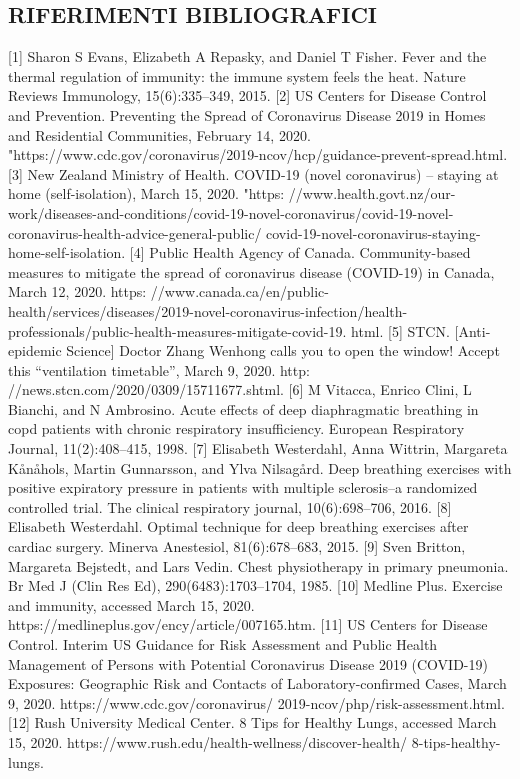 \documentclass[onecolumn,journal]{IEEEtran}
\begin{document}
\begin{multicols}{2}
\section*{RIFERIMENTI BIBLIOGRAFICI}
[1] Sharon S Evans, Elizabeth A Repasky, and Daniel T Fisher. Fever and the thermal regulation of immunity: the immune system feels the heat. Nature
Reviews Immunology, 15(6):335–349, 2015.
[2] US Centers for Disease Control and Prevention. Preventing the Spread of Coronavirus Disease 2019 in Homes and Residential Communities, February
14, 2020. "https://www.cdc.gov/coronavirus/2019-ncov/hcp/guidance-prevent-spread.html.
[3] New Zealand Ministry of Health. COVID-19 (novel coronavirus) – staying at home (self-isolation), March 15, 2020. "https:
//www.health.govt.nz/our-work/diseases-and-conditions/covid-19-novel-coronavirus/covid-19-novel-coronavirus-health-advice-general-public/
covid-19-novel-coronavirus-staying-home-self-isolation.
[4] Public Health Agency of Canada. Community-based measures to mitigate the spread of coronavirus disease (COVID-19) in Canada, March 12, 2020. https:
//www.canada.ca/en/public-health/services/diseases/2019-novel-coronavirus-infection/health-professionals/public-health-measures-mitigate-covid-19.
html.
[5] STCN. [Anti-epidemic Science] Doctor Zhang Wenhong calls you to open the window! Accept this “ventilation timetable”, March 9, 2020. http:
//news.stcn.com/2020/0309/15711677.shtml.
[6] M Vitacca, Enrico Clini, L Bianchi, and N Ambrosino. Acute effects of deep diaphragmatic breathing in copd patients with chronic respiratory
insufficiency. European Respiratory Journal, 11(2):408–415, 1998.
[7] Elisabeth Westerdahl, Anna Wittrin, Margareta Kånåhols, Martin Gunnarsson, and Ylva Nilsagård. Deep breathing exercises with positive expiratory
pressure in patients with multiple sclerosis–a randomized controlled trial. The clinical respiratory journal, 10(6):698–706, 2016.
[8] Elisabeth Westerdahl. Optimal technique for deep breathing exercises after cardiac surgery. Minerva Anestesiol, 81(6):678–683, 2015.
[9] Sven Britton, Margareta Bejstedt, and Lars Vedin. Chest physiotherapy in primary pneumonia. Br Med J (Clin Res Ed), 290(6483):1703–1704, 1985.
[10] Medline Plus. Exercise and immunity, accessed March 15, 2020. https://medlineplus.gov/ency/article/007165.htm.
[11] US Centers for Disease Control. Interim US Guidance for Risk Assessment and Public Health Management of Persons with Potential Coronavirus
Disease 2019 (COVID-19) Exposures: Geographic Risk and Contacts of Laboratory-confirmed Cases, March 9, 2020. https://www.cdc.gov/coronavirus/
2019-ncov/php/risk-assessment.html.
[12] Rush University Medical Center. 8 Tips for Healthy Lungs, accessed March 15, 2020. https://www.rush.edu/health-wellness/discover-health/
8-tips-healthy-lungs.


\end{multicols}
\end{document}

